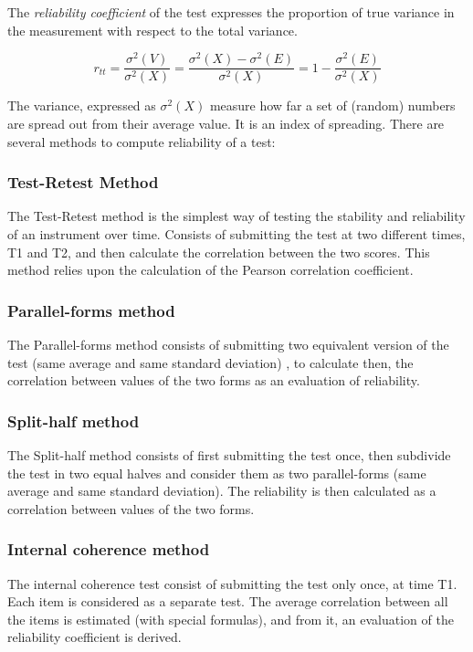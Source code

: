 \documentclass[b5paper,10pt,twoside,cucitura]{toptesi}
\begin{document}
\noindent 
The \textit{reliability coefficient} of the test expresses the proportion of true variance in the measurement with respect to the total variance.

\begin{equation}
    r_{tt} = \frac{\sigma^{2} (V)}{\sigma^{2}(X)} = \frac{\sigma^{2} (X) - \sigma^{2} (E)}{\sigma^{2}(X)} = 1 - \frac{\sigma^{2} (E)}{\sigma^{2}(X)}
\end{equation}

The variance, expressed as $\sigma^{2}(X)$ measure how far a set of (random) numbers are spread out from their average value. It is an index of spreading. 
There are several methods to compute reliability of a test:

\subsubsection{Test-Retest Method}
The Test-Retest method is the simplest way of testing the stability and reliability of an instrument over time. Consists of submitting the test at two different times, T1 and T2, and then calculate the correlation between the two scores. This method relies upon the calculation of the Pearson correlation coefficient.

\subsubsection{Parallel-forms method}
The Parallel-forms method consists of submitting two equivalent version of the test (same average and same standard deviation) , to calculate then, the correlation between values of the two forms as an evaluation of reliability.

\subsubsection{Split-half method}
The Split-half method consists of first submitting the test once, then subdivide the test in two equal halves and consider them as two parallel-forms (same average and same standard deviation). The reliability is then calculated as a correlation between values of the two forms.

\subsubsection{Internal coherence method}
The internal coherence test consist of submitting the test only once, at time T1. Each item is considered as a separate test. The average correlation between all the items is estimated (with special formulas), and from it, an evaluation of the reliability coefficient is derived.
\end{document}
